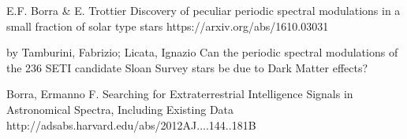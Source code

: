 

E.F. Borra & E. Trottier
Discovery of peculiar periodic spectral modulations in a small fraction of solar type stars
https://arxiv.org/abs/1610.03031

by Tamburini, Fabrizio; Licata, Ignazio
Can the periodic spectral modulations of the 236 SETI candidate Sloan Survey stars be due to Dark Matter effects?

Borra, Ermanno F.
Searching for Extraterrestrial Intelligence Signals in Astronomical Spectra, Including Existing Data
http://adsabs.harvard.edu/abs/2012AJ....144..181B


















